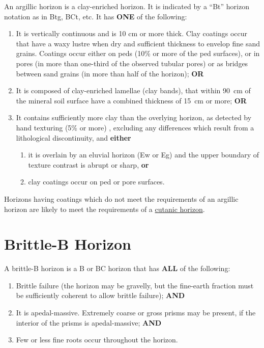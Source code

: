 \documentclass[
  letterpaper,
  DIV=11,
  numbers=noendperiod]{scrreprt}
\providecommand{\tightlist}{%
  \setlength{\itemsep}{0pt}\setlength{\parskip}{0pt}}\usepackage{longtable,booktabs,array}
\begin{document}
An argillic horizon is a clay-enriched horizon. It is indicated by a
``Bt'' horizon notation as in Btg, BCt, etc. It has \textbf{ONE} of the
following:

\begin{enumerate}
\def\labelenumi{\arabic{enumi}.}
\tightlist
\item
  It is vertically continuous and is 10 cm or more thick. Clay coatings
  occur that have a waxy lustre when dry and sufficient thickness to
  envelop fine sand grains. Coatings occur either on peds (10\% or more
  of the ped surfaces), or in pores (in more than one-third of the
  observed tubular pores) or as bridges between sand grains (in more
  than half of the horizon); \textbf{OR}
\item
  It is composed of clay-enriched lamellae (clay bands), that within
  90~cm of the mineral soil surface have a combined thickness of 15~cm
  or more; \textbf{OR}
\item
  It contains sufficiently more clay than the overlying horizon, as
  detected by hand texturing (5\% or more) , excluding any differences
  which result from a lithological discontinuity, and \textbf{either}

  \begin{enumerate}
  \def\labelenumii{(\alph{enumii})}
  \tightlist
  \item
    it is overlain by an eluvial horizon (Ew or Eg) and the upper
    boundary of texture contrast is abrupt or sharp, \textbf{or}
  \item
    clay coatings occur on ped or pore surfaces.
  \end{enumerate}
\end{enumerate}

Horizons having coatings which do not meet the requirements of an
argillic horizon are likely to meet the requirements of a
\protect\hyperlink{sec-diag-cuth}{cutanic horizon}.

\hypertarget{sec-diag-britb}{%
\section{Brittle-B Horizon}\label{sec-diag-britb}}

A brittle-B horizon is a B or BC horizon that has \textbf{ALL} of the
following:

\begin{enumerate}
\def\labelenumi{\arabic{enumi}.}
\tightlist
\item
  Brittle failure (the horizon may be gravelly, but the fine-earth
  fraction must be sufficiently coherent to allow brittle failure);
  \textbf{AND}
\item
  It is apedal-massive. Extremely coarse or gross prisms may be present,
  if the interior of the prisms is apedal-massive; \textbf{AND}
\item
  Few or less fine roots occur throughout the horizon.
\end{enumerate}
\end{document}
